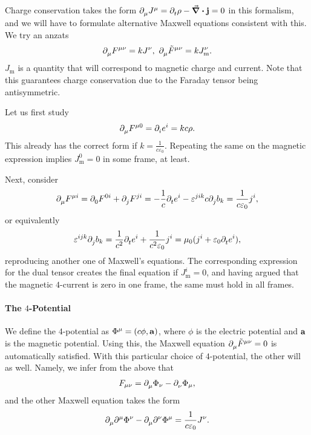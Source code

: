 Charge conservation takes the form $\del{\mu}{J^{\mu}} = \del{t}{\rho} - \div{\vb{j}} = 0$ in this formalism, and we will have to formulate alternative Maxwell equations consistent with this. We try an anzats
\begin{align*}
	\del{\mu}{F^{\mu\nu}} = kJ^{\nu},\ \del{\mu}{\tilde{F}^{\mu\nu}} = kJ_{\text{m}}^{\nu}.
\end{align*}
$J_{\text{m}}$ is a quantity that will correspond to magnetic charge and current. Note that this guarantees charge conservation due to the Faraday tensor being antisymmetric.

Let us first study
\begin{align*}
	\del{\mu}{F^{\mu 0}} = \del{i}{e^{i}} = kc\rho.
\end{align*}
This already has the correct form if $k = \frac{1}{c\varepsilon_{0}}$. Repeating the same on the magnetic expression implies $J_{\text{m}}^{0} = 0$ in some frame, at least.

Next, consider
\begin{align*}
	\del{\mu}{F^{\mu i}} = \del{0}{F^{0i}} + \del{j}{F^{ji}} = -\frac{1}{c}\del{t}{e^{i}} - \varepsilon^{jik}c\del{j}{b_{k}} = \frac{1}{c\varepsilon_{0}}j^{i},
\end{align*}
or equivalently
\begin{align*}
	\varepsilon^{ijk}\del{j}{b_{k}} = \frac{1}{c^{2}}\del{t}{e^{i}} + \frac{1}{c^{2}\varepsilon_{0}}j^{i} = \mu_{0}(j^{i} + \varepsilon_{0}\del{t}{e^{i}}),
\end{align*}
reproducing another one of Maxwell's equations. The corresponding expression for the dual tensor creates the final equation if $J_{\text{m}}^{i} = 0$, and having argued that the magnetic $4$-current is zero in one frame, the same must hold in all frames.

\paragraph{The $4$-Potential}
We define the $4$-potential as $\Phi^{\mu} = (c\phi, \vb{a})$, where $\phi$ is the electric potential and $\vb{a}$ is the magnetic potential. Using this, the Maxwell equation $\del{\mu}{\tilde{F}^{\mu\nu}} = 0$ is automatically satisfied. With this particular choice of $4$-potential, the other will as well. Namely, we infer from the above that 
\begin{align*}
	F_{\mu\nu} = \del{\mu}{\Phi_{\nu}} - \del{\nu}{\Phi_{\mu}},
\end{align*}
and the other Maxwell equation takes the form
\begin{align*}
	\del{\mu}{\del[\mu]{}{\Phi^{\nu}}} - \del{\mu}{\del[\nu]{}{\Phi^{\mu}}} = \frac{1}{c\varepsilon_{0}}J^{\nu}.
\end{align*}

